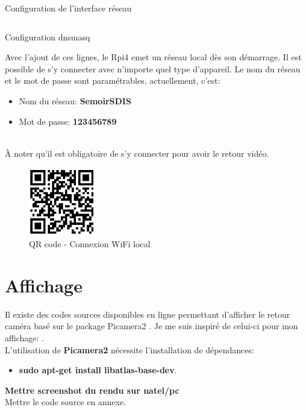 \begin{listing}[ht]
    \inputminted{makefile}{interfaces.make}
    \caption{Configuration de l'interface réseau \label{interfaces}}
\end{listing}

\begin{listing}[ht]
    \inputminted{makefile}{dnsmasq.make}
    \caption{Configuration dnsmasq \label{dnsmasq}}
\end{listing}

Avec l'ajout de ces lignes, le Rpi4 emet un réseau local dès son démarrage. Il est possible de s'y connecter avec n'importe quel
type d'appareil. Le nom du réseau et le mot de passe sont paramétrables, actuellement, c'est:
\begin{itemize}
    \item Nom du réseau: \textbf{SemoirSDIS}
    \item Mot de passe: \textbf{123456789}
\end{itemize}\\
À noter qu'il est obligatoire de s'y connecter pour avoir le retour vidéo.

\begin{figure}[H]
    \centering
    \includegraphics[width=3cm]{assets/figures/acces_wifi.PNG}
    \caption{QR code - Connexion WiFi local}
\end{figure}

\section{Affichage}
Il existe des codes sources disponibles en ligne permettant d'afficher le retour caméra basé sur le package Picamera2 \cite{picamera2}.
Je me suis inspiré de celui-ci pour mon affichage: \cite{code_camera}.\\
L'utilisation de \textbf{Picamera2} nécessite l'installation de dépendances:
\begin{itemize}
    \item \textbf{sudo apt-get install libatlas-base-dev}.
\end{itemize}
\textbf{Mettre screenshot du rendu sur natel/pc}\\
Mettre le code source en annexe.
